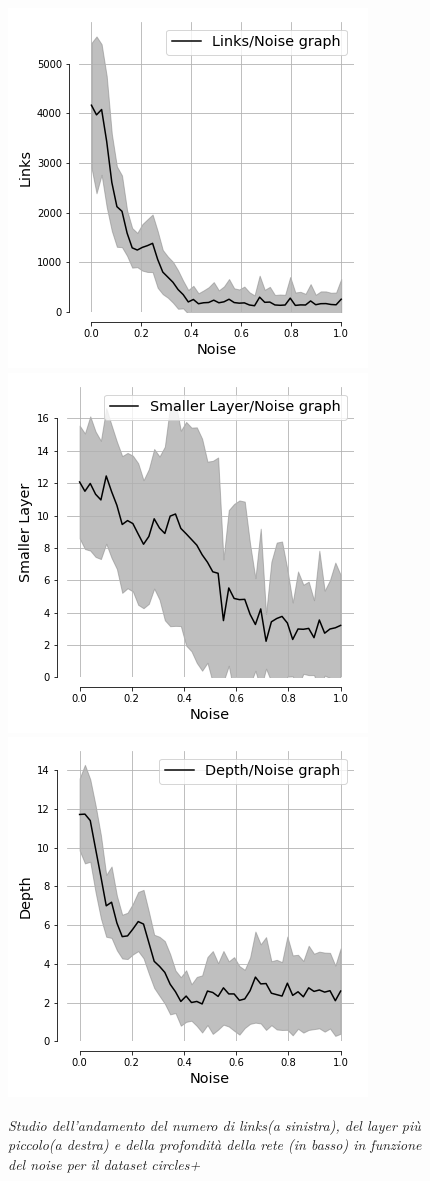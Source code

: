 \documentclass[12pt,a4paper]{report}
\begin{document}
\begin{figure}[H]
 \centering
 \includegraphics[scale = 0.5]{images/links_noise_circles+}
 \includegraphics[scale = 0.5]{images/small_noise_circles+}
 \includegraphics[scale = 0.5]{images/depth_noise_circles+}
 \caption{\textit{Studio dell'andamento del numero di links(a sinistra), del layer più piccolo(a destra) e della profondità della rete (in basso) in funzione del noise per il dataset circles+}}
 \label{noisecircles+}
\end{figure}
\end{document}

